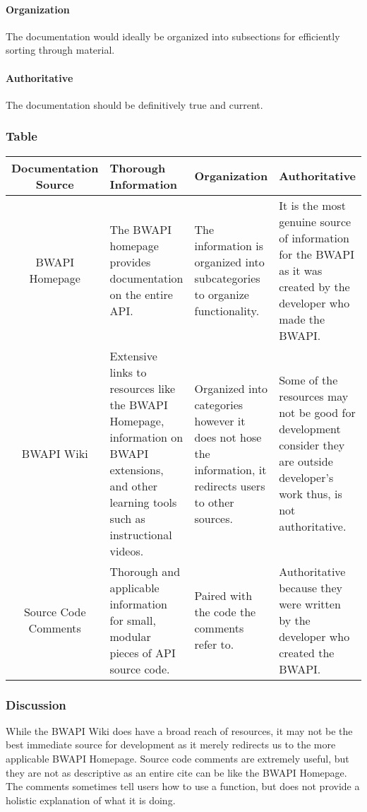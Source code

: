 \documentclass[10pt,letterpaper,onecolumn,draftclsnofoot]{IEEEtran}
\begin{document}
	\paragraph{Organization}
	The documentation would ideally be organized into subsections for efficiently sorting through material.
	\paragraph{Authoritative}
	The documentation should be definitively true and current.
\subsubsection{Table}
\begin{center}
	\begin{tabular}{ ||C|M|M|M|| } 
		\hline
		Documentation Source & Thorough Information & Organization & Authoritative \\
		\hline
		BWAPI Homepage & The BWAPI homepage provides documentation on the entire API. & The information is organized into subcategories to organize functionality. & It is the most genuine source of information for the BWAPI as it was created by the developer who made the BWAPI. \\ 
		\hline
		BWAPI Wiki & Extensive links to resources like the BWAPI Homepage, information on BWAPI extensions, and other learning tools such as instructional videos. & Organized into categories however it does not hose the information, it redirects users to other sources. & Some of the resources may not be good for development consider they are outside developer's work thus, is not authoritative.  \\ 
		\hline
		Source Code Comments & Thorough and applicable information for small, modular pieces of API source code. & Paired with the code the comments refer to. & Authoritative because they were written by the developer who created the BWAPI. \\ 
		\hline
	\end{tabular}
\end{center}
\subsubsection{Discussion}
While the BWAPI Wiki does have a broad reach of resources, it may not be the best immediate source for development as it merely redirects us to the more applicable BWAPI Homepage. Source code comments are extremely useful, but they are not as descriptive as an entire cite can be like the BWAPI Homepage. The comments sometimes tell users how to use a function, but does not provide a holistic explanation of what it is doing.
\end{document}

